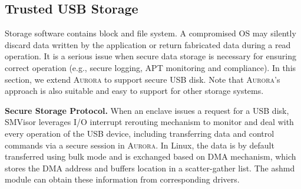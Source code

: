 \subsection{Trusted USB Storage}\label{storage_service}
Storage software contains block and file system. A compromised OS may silently discard data written by the application or return fabricated data during a read operation. It is a serious issue when secure data storage is  necessary for ensuring correct operation (e.g., secure logging, APT monitoring and compliance). In this section, we extend \textsc{Aurora} to support secure USB disk. Note that \textsc{Aurora}'s approach is also suitable and easy to support for other storage systems.


\textbf{Secure Storage Protocol.}
When an enclave issues a request for a USB disk, SMVisor leverages I/O interrupt rerouting mechanism to monitor and deal with every operation of the USB device, including transferring data and control commands via a secure session in \textsc{Aurora}. In Linux, the data is by default transferred using bulk mode and is exchanged based on DMA mechanism, which stores the DMA address and buffers location in a {scatter-gather} list. The ashmd module can obtain these information from corresponding drivers.

